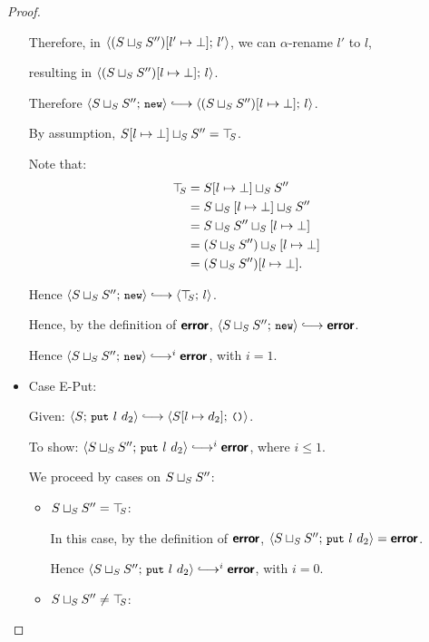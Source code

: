 \begin{proof}
\begin{itemize}
    Therefore, in
    $\langle (S \sqcup_{S} S'')[l' \mapsto \bot];\, l' \rangle$, we can
    $\alpha$-rename $l'$ to $l$,

    resulting in $\langle (S \sqcup_{S} S'')[l \mapsto \bot];\, l \rangle$.

    Therefore $\config{\lubstore{S}{S''}}{\NEW} \parstepsto
    \config{\extSRaw{(\lubstore{S}{S''})}{l}{\bot}}{l}$.

    By assumption, $S[l \mapsto \bot] \sqcup_{S} S'' = \top\hspace{-0.85mm}_{S}$.

    Note that:
    \begin{align*}
      \top\hspace{-0.85mm}_{S} &= S[l \mapsto \bot] \sqcup_{S} S'' \\ &=
      S \sqcup_{S} \left[ l \mapsto \bot \right] \sqcup_{S} S'' \\ &=
      S \sqcup_{S} S'' \sqcup_{S} \left[ l \mapsto \bot \right] \\ &=
      (S \sqcup_{S} S'') \sqcup_{S} \left[ l \mapsto \bot \right] \\ &=
      (S \sqcup_{S} S'')[l \mapsto \bot] .
    \end{align*}

    Hence $\config{\lubstore{S}{S''}}{\NEW} \parstepsto
    \config{\topS}{l}$.

    Hence, by the definition of $\textbf{\textsf{error}}$,
    $\config{\lubstore{S}{S''}}{\NEW} \parstepsto \error$.

    Hence $\config{\lubstore{S}{S''}}{\NEW} \parstepsto^i \error$,
    with $i = 1$.

  \item Case {\sc E-Put}:

    Given: $\config{S}{\putexp{l}{d_2}} \parstepsto
    \config{\extSRaw{S}{l}{d_2}}{\unit}$.

    To show: $\config{\lubstore{S}{S''}}{\putexp{l}{d_2}}
    \parstepsto^i \error$, where $i \leq 1$.

    We proceed by cases on $S \sqcup_{S} S''$:

    \begin{itemize}

    \item $S \sqcup_{S} S'' = \top\hspace{-0.85mm}_{S}$:

      In this case, by the definition of $\textbf{\textsf{error}}$,
      $\langle S \sqcup_{S} S'';\, \mbox{\small{\texttt{put}}}~l~d_2 \rangle = \textbf{\textsf{error}}$.

      Hence $\config{\lubstore{S}{S''}}{\putexp{l}{d_2}} \parstepsto^i
      \error$, with $i = 0$.

    \item $S \sqcup_{S} S'' \neq \top\hspace{-0.85mm}_{S}$:


\end{itemize}
\end{itemize}
\end{proof}
